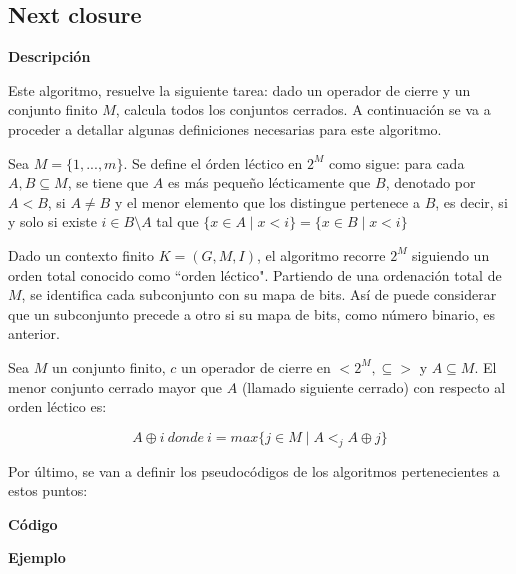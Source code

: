        \clearpage



\subsection{Next closure}

        \textbf{Descripci\'on}

        Este algoritmo, resuelve la siguiente tarea: dado un operador de cierre y un conjunto finito \(M\), calcula todos los 
        conjuntos cerrados. A continuaci\'on se va a proceder a detallar algunas definiciones necesarias para este algoritmo.

        Sea \(M=\{1, ..., m\}\). Se define el \'orden l\'ectico en \(2^M\) como sigue: para cada \(A,B \subseteq M\), se tiene que \(A\) 
        es m\'as peque\~no l\'ecticamente que \(B\), denotado por \(A < B\), si \(A \neq B\) y el menor elemento que los distingue 
        pertenece a \(B\), es decir, si y solo si existe \(i \in B \setminus A \) tal que \( \{x \in A \mid x < i\} = \{x \in B 
        \mid x < i\} \)

        Dado un contexto finito \( K=(G, M, I) \), el algoritmo recorre \(2^M\) siguiendo un orden total conocido como ``orden l\'ectico". 
        Partiendo de una ordenaci\'on total de \(M\), se identifica cada subconjunto con su mapa de bits. As\'i de puede considerar 
        que un subconjunto precede a otro si su mapa de bits, como n\'umero binario, es anterior.
    

        Sea \(M\) un conjunto finito, \(c\) un operador de cierre en \(<2^M, \subseteq > \) y \(A \subseteq M \). El menor 
        conjunto cerrado mayor que \(A\) (llamado siguiente cerrado) con respecto al orden l\'ectico es:

        \[
            A \oplus i ~ donde ~ i = max \{j \in M \mid A <_{j} A \oplus j \}
        \]

        Por \'ultimo, se van a definir los pseudoc\'odigos de los algoritmos pertenecientes a estos puntos: 

        \bigskip

        
    
        \bigskip

        
    
        \bigskip


    
        \textbf{C\'odigo}
    
    
        \textbf{Ejemplo}


